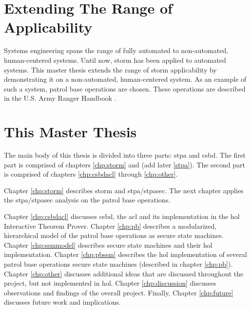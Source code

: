 \documentclass[../../main/main.tex]{subfiles}
\begin{document}
\section{Extending The Range of Applicability}\label{sec:intro:motivation}


Systems engineering spans the range of fully automated to non-automated, human-centered systems.  Until now, \gls{storm} has been applied to automated systems.  This master thesis extends the range of \gls{storm} applicability by demonstrating it on a non-automated, human-centered system.  As an example of such a system, patrol base operations are chosen.  These operations are described in the U.S. Army Ranger Handbook \cite{rangermanual}.   

\section{This Master Thesis}\label{sec:thismasterthesis}
The main body of this thesis is divided into three parts: \gls{stpa} and \gls{csbd}. The first part is comprised of chapters \ref{chp:storm} and (add later \ref{stpa}).  The second part is comprised of chapters \ref{chp:csbdacl} through \ref{chp:other}.


Chapter \ref{chp:storm} describes \gls{storm} and \gls{stpa}/\gls{stpasec}.  The next chapter applies the \gls{stpa}/\gls{stpasec} analysis on the patrol base operations.  

Chapter \ref{chp:csbdacl} discusses \gls{csbd}, the \gls{acl} and its implementation in the \Gls{hol} Interactive Theorem Prover.  Chapter \ref{chp:pb} describes a modularized, hierarchical model of the patrol base operations as secure state machines. Chapter \ref{chp:ssmmodel} describes secure state machines and their \gls{hol} implementation.  Chapter \ref{chp:pbssm} describes the \gls{hol} implementation of several patrol base operations secure state machines (described in chapter \ref{chp:pb}).  Chapter \ref{chp:other} discusses additional ideas that are discussed throughout the project, but not implemented in  \gls{hol}.  Chapter \ref{chp:discussion} discusses observations and findings of the overall project.  Finally, Chapter \ref{chp:future} discusses future work and implications. 
\end{document}
